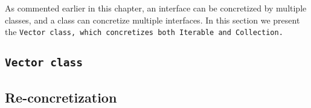 \def\Subsection#1{\subsection{#1}}

As commented earlier in this chapter, an interface can be concretized
by multiple classes, and a class can concretize multiple interfaces.
In this section we present the \tt{Vector} class,
which concretizes both \tt{Iterable} and \tt{Collection}.

\subsection{\tt{Vector} class}


\Subsection{Re-concretization}
